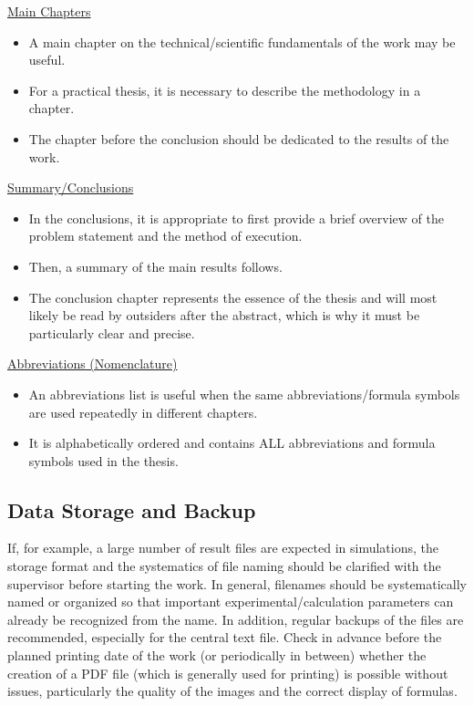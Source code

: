 \underline{Main Chapters}

\begin{itemize}
    \item A main chapter on the technical/scientific fundamentals of the work may be useful.
    \item For a practical thesis, it is necessary to describe the methodology in a chapter.
    \item The chapter before the conclusion should be dedicated to the results of the work.
\end{itemize}

\underline{Summary/Conclusions}

\begin{itemize}
    \item In the conclusions, it is appropriate to first provide a brief overview of the problem statement and the method of execution.
    \item Then, a summary of the main results follows.
    \item The conclusion chapter represents the essence of the thesis and will most likely be read by outsiders after the abstract, which is why it must be particularly clear and precise.
\end{itemize}

\underline{Abbreviations (Nomenclature)}

\begin{itemize}
    \item An abbreviations list is useful when the same abbreviations/formula symbols are used repeatedly in different chapters.
    \item It is alphabetically ordered and contains ALL abbreviations and formula symbols used in the thesis.
\end{itemize}


\subsection{Data Storage and Backup}
\label{sec:dataStorageAndBackup}

If, for example, a large number of result files are expected in simulations, the storage format and the systematics of file naming should be clarified with the supervisor before starting the work. In general, filenames should be systematically named or organized so that important experimental/calculation parameters can already be recognized from the name. In addition, regular backups of the files are recommended, especially for the central text file. Check in advance before the planned printing date of the work (or periodically in between) whether the creation of a PDF file (which is generally used for printing) is possible without issues, particularly the quality of the images and the correct display of formulas.


